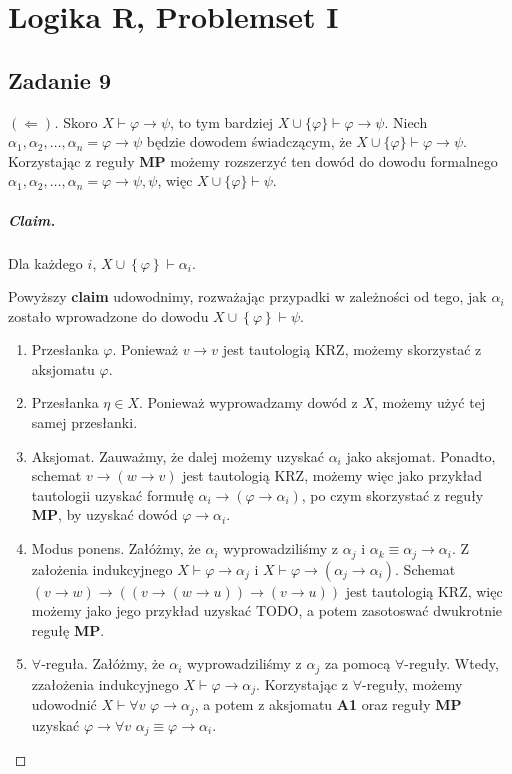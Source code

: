 \chapter{Logika R, Problemset I}

\section*{Zadanie 9}

\begin{proof}[\( (\Leftarrow) \)]
    Skoro \( X \vdash \varphi \to \psi \), to tym bardziej \( X \cup \{\varphi\} \vdash \varphi \to \psi \). Niech \( \alpha_1, \alpha_2, \ldots, \alpha_n = \varphi \to \psi \) będzie dowodem świadczącym, że \( X \cup \{ \varphi \} \vdash \varphi \to \psi \). Korzystając z reguły \textbf{MP} możemy rozszerzyć ten dowód do dowodu formalnego \( \alpha_1, \alpha_2, \ldots, \alpha_n = \varphi \to \psi, \psi \), więc \( X \cup \{\varphi\} \vdash \psi \).

    \paragraph{Claim.} Dla każdego \( i \), \( X \cup \left\{ \varphi \right\} \vdash \alpha_i \).

    Powyższy \textbf{claim} udowodnimy, rozważając przypadki w zależności od tego, jak \( \alpha_i \) zostało wprowadzone do dowodu \( X \cup \left\{ \varphi \right\} \vdash \psi\).

    \begin{enumerate}
        \item Przesłanka \( \varphi \). Ponieważ \( v \to v \) jest tautologią KRZ, możemy skorzystać z aksjomatu \( \varphi \).
        \item Przesłanka \( \eta \in X \). Ponieważ wyprowadzamy dowód z \( X \), możemy użyć tej samej przesłanki.
        \item Aksjomat. Zauważmy, że dalej możemy uzyskać \( \alpha_i \) jako aksjomat. Ponadto, schemat \( v \to (w \to v) \) jest tautologią KRZ, możemy więc jako przykład tautologii uzyskać formułę \( \alpha_i \to (\varphi \to \alpha_i) \), po czym skorzystać z reguły \textbf{MP}, by uzyskać dowód \( \varphi \to \alpha_i \).
        \item Modus ponens. Załóżmy, że \( \alpha_i \) wyprowadziliśmy z \( \alpha_j \) i \( \alpha_k \equiv \alpha_j \to \alpha_i \). Z założenia indukcyjnego \( X \vdash \varphi \to \alpha_j \) i \( X \vdash \varphi \to (\alpha_j \to \alpha_i) \). Schemat \( (v \to w) \to ((v \to (w \to u)) \to (v \to u)) \) jest tautologią KRZ, więc możemy jako jego przykład uzyskać TODO, a potem zasotoswać dwukrotnie regułę \textbf{MP}.
        \item \( \forall \)-reguła. Załóżmy, że \( \alpha_i \) wyprowadziliśmy z \( \alpha_j \) za pomocą \( \forall \)-reguły. Wtedy, zzałożenia indukcyjnego \( X \vdash \varphi \to \alpha_j \). Korzystając z \( \forall \)-reguły, możemy udowodnić \( X \vdash \forall v\,\,\varphi \to \alpha_j \), a potem z aksjomatu \textbf{A1} oraz reguły \textbf{MP} uzyskać \( \varphi \to \forall v\,\,\alpha_j \equiv \varphi \to \alpha_i \).
    \end{enumerate}
\end{proof}

